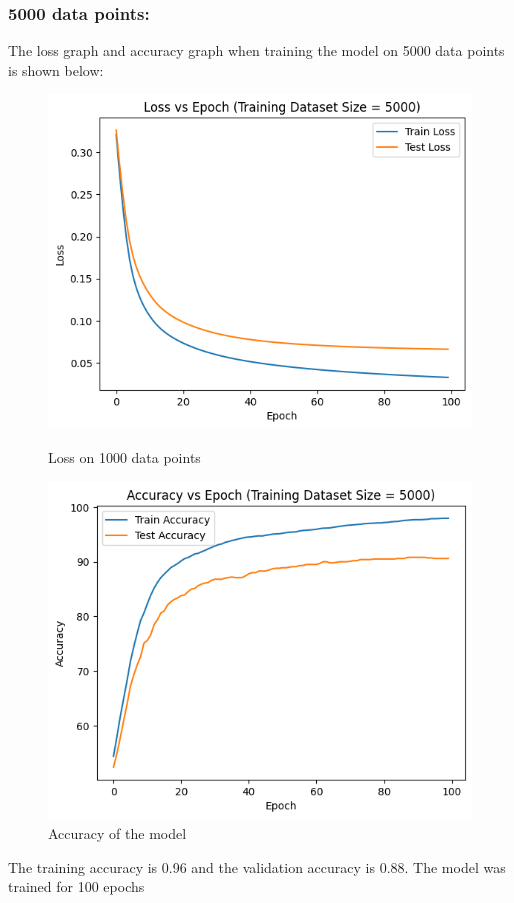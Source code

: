 \documentclass{article}
\begin{document}
\subsubsection*{5000 data points:}
The loss graph and accuracy graph when training the model on 5000 data points is shown below:
\begin{figure}[h!]
    \centering
    \begin{minipage}{0.45\textwidth}
        \centering
        \includegraphics[width=1\textwidth]{output5000.png} %
        \caption{Loss on 1000 data points}
    \end{minipage}\hfill
    \begin{minipage}{0.45\textwidth}
        \centering
        \includegraphics[width=1\textwidth]{acc5000.png} %
        \caption{Accuracy of the model}
    \end{minipage}
\end{figure}
\newline The training accuracy is 0.96 and the validation accuracy is 0.88. The model was trained for 100 epochs\newline
\end{document}

